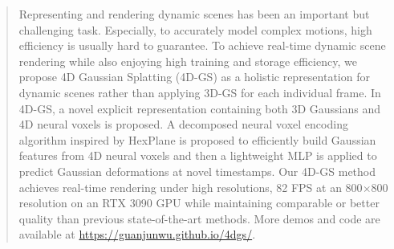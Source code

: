 \begin{abstract}
Representing and rendering dynamic scenes has been an important but challenging task. Especially, to accurately model complex motions, high efficiency is usually hard to guarantee. To achieve real-time dynamic scene rendering while also enjoying high training and storage efficiency, we propose 4D Gaussian Splatting (4D-GS) as a holistic representation for dynamic scenes rather than applying 3D-GS for each individual frame. In 4D-GS, a novel explicit representation containing both 3D Gaussians and 4D neural voxels is proposed. A decomposed neural voxel encoding algorithm inspired by HexPlane is proposed to efficiently build Gaussian features from 4D neural voxels and then a lightweight MLP is applied to predict Gaussian deformations at novel timestamps.
Our 4D-GS method achieves real-time rendering under high resolutions, 82 FPS at an 800$\times$800 resolution on an RTX 3090 GPU while maintaining comparable or better quality than previous state-of-the-art methods. More demos and code are available at \url{https://guanjunwu.github.io/4dgs/}. 
\end{abstract}